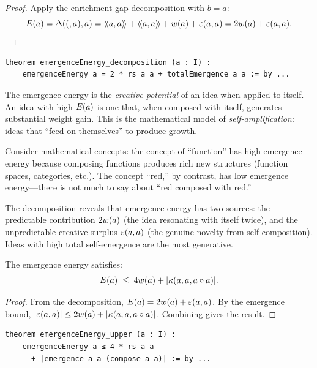 \begin{proof}
Apply the enrichment gap decomposition with $b = a$:
\[
  E(a) = \Delta((,a),a) = \langle\!\langle a, a \rangle\!\rangle + \langle\!\langle a, a \rangle\!\rangle + w(a) + \varepsilon(a,a)
  = 2w(a) + \varepsilon(a,a).
\]
\end{proof}

\begin{lstlisting}[caption={Energy decomposition (IDT\_v3\_Emergence.lean)}]
theorem emergenceEnergy_decomposition (a : I) :
    emergenceEnergy a = 2 * rs a a + totalEmergence a a := by ...
\end{lstlisting}

\begin{interpretation}
The emergence energy is the \emph{creative potential} of an idea when applied
to itself. An idea with high $E(a)$ is one that, when composed with itself,
generates substantial weight gain. This is the mathematical model of
\emph{self-amplification}: ideas that ``feed on themselves'' to produce growth.

Consider mathematical concepts: the concept of ``function'' has high emergence
energy because composing functions produces rich new structures (function spaces,
categories, etc.). The concept ``red,'' by contrast, has low emergence energy---there
is not much to say about ``red composed with red.''

The decomposition reveals that emergence energy has two sources: the predictable
contribution $2w(a)$ (the idea resonating with itself twice), and the
unpredictable creative surplus $\varepsilon(a,a)$ (the genuine novelty from
self-composition). Ideas with high total self-emergence are the most generative.
\end{interpretation}

\begin{theorem}
\label{thm:energy-upper}
The emergence energy satisfies:
\[
  E(a) \;\leq\; 4w(a) + |\kappa(a,a,a \circ a)|.
\]
\end{theorem}

\begin{proof}
From the decomposition, $E(a) = 2w(a) + \varepsilon(a,a)$. By the
emergence bound, $|\varepsilon(a,a)| \leq 2w(a) + |\kappa(a,a,a \circ a)|$.
Combining gives the result.
\end{proof}

\begin{lstlisting}[caption={Energy upper bound (IDT\_v3\_Emergence.lean)}]
theorem emergenceEnergy_upper (a : I) :
    emergenceEnergy a ≤ 4 * rs a a
      + |emergence a a (compose a a)| := by ...
\end{lstlisting}

